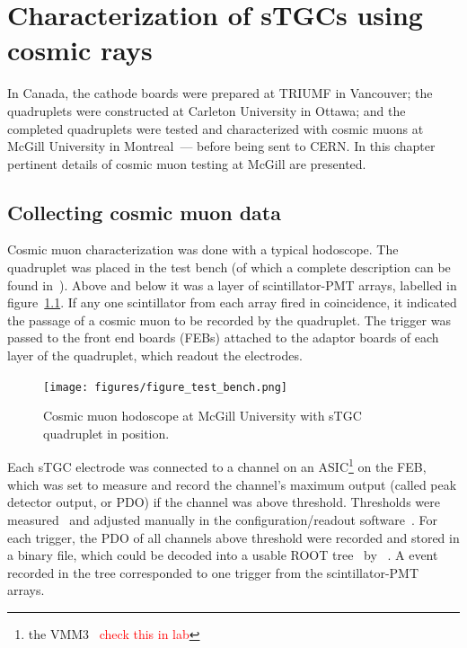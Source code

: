 

\chapter{Characterization of sTGCs using cosmic rays}
\label{chap:cosmics}

In Canada, the cathode boards were prepared at TRIUMF in Vancouver; the quadruplets were constructed at Carleton University in Ottawa; and the completed quadruplets were tested and characterized with cosmic muons at McGill University in Montreal~--- before being sent to CERN. In this chapter pertinent details of cosmic muon testing at McGill are presented. 

\section{Collecting cosmic muon data}

Cosmic muon characterization was done with a typical hodoscope.  The quadruplet was placed in the test bench (of which a complete description can be found in~\cite{lefebvre_thesis}). Above and below it was a layer of scintillator-PMT arrays, labelled in figure~\ref{fig:hodoscope}. If any one scintillator from each array fired in coincidence, it indicated the passage of a cosmic muon to be recorded by the quadruplet. The trigger was passed to the front end boards (FEBs) attached to the adaptor boards of each layer of the quadruplet, which readout the electrodes.

\begin{figure}
    \centering
    \texttt{[image: figures/figure\_test\_bench.png]}
    \caption{Cosmic muon hodoscope at McGill University with sTGC quadruplet in position.}
    \label{fig:hodoscope}
\end{figure}

Each sTGC electrode was connected to a channel on an ASIC\footnote{the VMM3~\cite{iakovidis_vmm3_2017} \textcolor{red}{check this in lab}} on the FEB, which was set to measure and record the channel's maximum output (called peak detector output, or PDO) if the channel was above threshold. Thresholds were measured~\cite{chen_calibration_2019} and adjusted manually in the configuration/readout software~\cite{siyuan_sun_stgc_readout_sw}. For each trigger, the PDO of all channels above threshold were recorded and stored in a binary file, which could be decoded into a usable ROOT tree~\cite{ROOT} by ~\cite{lefebvre_tgc_analysis}. A event recorded in the tree corresponded to one trigger from the scintillator-PMT arrays. 

